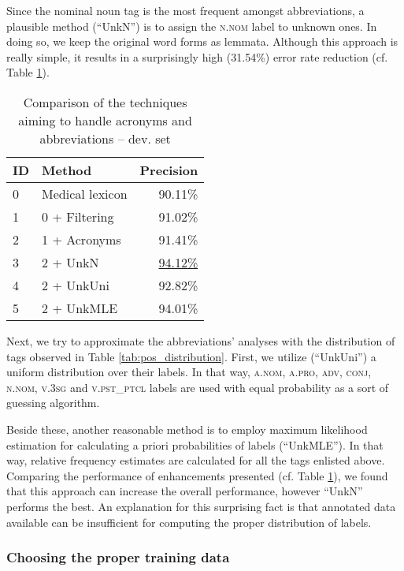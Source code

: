 Since the nominal noun tag is the most frequent amongst abbreviations, a plausible method (``UnkN'') is to assign the \textsc{n.nom} label to unknown ones. 
In doing so, we keep the original word forms as lemmata. 
Although this approach is really simple, it results in a surprisingly high (31.54\%) error rate reduction (cf. Table \ref{tab:abbrev_fixes}). 

\begin{table}[H]
\centering
\caption{Comparison of the techniques aiming to handle acronyms and abbreviations --  dev. set}
\label{tab:abbrev_fixes}
\begin{tabular}{ l l r } 
\hline
ID & Method &  Precision \\
\hline
0 & Medical lexicon & 90.11\% \\
1 & 0 + Filtering & 91.02\% \\
2 & 1 + Acronyms & 91.41\% \\
3 & 2 + UnkN & \underline{94.12\%} \\
4 & 2 + UnkUni & 92.82\% \\
5 & 2 + UnkMLE & 94.01\% \\
\hline
\end{tabular}
\end{table}

Next, we try to approximate the abbreviations' analyses with the distribution of tags observed in Table \ref{tab:pos_distribution}. 
First, we utilize (``UnkUni'') a uniform distribution over their labels. %
In that way, \textsc{a.nom}, \textsc{a.pro}, \textsc{adv}, \textsc{conj}, \textsc{n.nom}, \textsc{v.3sg} and \textsc{v.pst\_ptcl} labels are used with equal probability as a sort of guessing algorithm.

Beside these, another reasonable method is to employ maximum likelihood estimation for calculating a priori probabilities of labels (``UnkMLE''). 
In that way, relative frequency estimates are calculated for all the tags enlisted above.
Comparing the performance of enhancements presented (cf. Table \ref{tab:abbrev_fixes}), we found that this approach can increase the overall performance, however ``UnkN'' performs the best.
An explanation for this surprising fact is that annotated data available can be insufficient for computing the proper distribution of labels.



\subsubsection{Choosing the proper training data}

